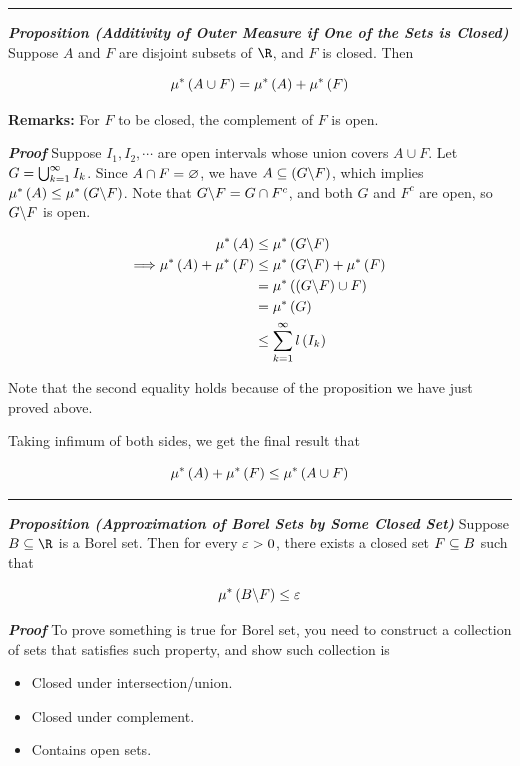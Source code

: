 \documentclass[
]{article}
\begin{document}
\begin{center}\rule{0.5\linewidth}{0.5pt}\end{center}

\emph{\textbf{Proposition (Additivity of Outer Measure if One of the
Sets is Closed)}} Suppose \(A\) and \(F\) are disjoint subsets of
\(\R\), and \(F\) is closed. Then

\[\mu^*\left(A\cup F\right) = \mu^*\left(A\right)+\mu^*\left(F\right)\]

\textbf{Remarks:} For \(F\) to be closed, the complement of \(F\) is
open.

\emph{\textbf{Proof}} Suppose \(I_1,I_2,\cdots\) are open intervals
whose union covers \(A\cup F\). Let \(G = \bigcup_{{k} = 1}^{\infty} I_k\). Since
\(A\cap F = \varnothing\), we have \(A\subseteq \left(G\backslash F\right)\), which implies
\(\mu^*\left(A\right)\le \mu^*\left(G\backslash F\right)\). Note that \(G\backslash F = G\cap F^c\), and
both \(G\) and \(F^c\) are open, so \(G\backslash F\) is open.

\[\begin{aligned}
 \mu^*\left(A\right)& \le \mu^*\left(G\backslash F\right)\\
\Longrightarrow \mu^*\left(A\right)+\mu^*\left(F\right)&\le \mu^*\left(G\backslash F\right)+\mu^*\left(F\right)\\
& = \mu^*\left(\left(G\backslash F\right)\cup F\right)\\
& = \mu^*\left(G\right)\\
& \le \sum_{{k} = 1}^{\infty} l\left(I_k\right)
\end{aligned}\]

Note that the second equality holds because of the proposition we have
just proved above.

Taking infimum of both sides, we get the final result that

\[\mu^*\left(A\right)+\mu^*\left(F\right)\le \mu^*\left(A\cup F\right)\]

\begin{center}\rule{0.5\linewidth}{0.5pt}\end{center}

\emph{\textbf{Proposition (Approximation of Borel Sets by Some Closed
Set)}} Suppose \(B\se \R\) is a Borel set. Then for every \(\varepsilon>0\),
there exists a closed set \(F\subseteq B\) such that

\[\mu^*\left(B\backslash F\right)\le \varepsilon\]

\emph{\textbf{Proof}} To prove something is true for Borel set, you need
to construct a collection of sets that satisfies such property, and show
such collection is

\begin{itemize}
\item
  Closed under intersection/union.
\item
  Closed under complement.
\item
  Contains open sets.
\end{itemize}
\end{document}
